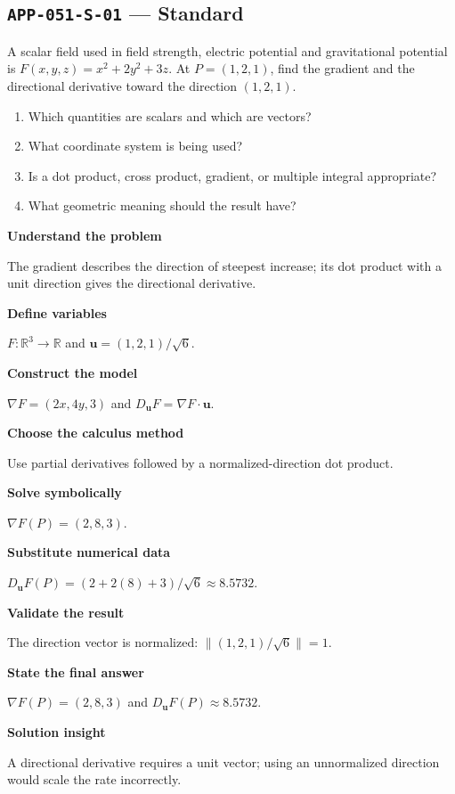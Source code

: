 \documentclass[11pt]{book}
\newcommand{\pid}[1]{\texttt{#1}}
\begin{document}
\subsection*{\pid{APP-051-S-01} — Standard}
\begin{problembox}
A scalar field used in field strength, electric potential and gravitational potential is $F(x,y,z)=x^2+2y^2+3z$. At $P=(1,2,1)$, find the gradient and the directional derivative toward the direction $(1,2,1)$.
\end{problembox}
\begin{promptbox}\begin{enumerate}
\item Which quantities are scalars and which are vectors?
\item What coordinate system is being used?
\item Is a dot product, cross product, gradient, or multiple integral appropriate?
\item What geometric meaning should the result have?
\end{enumerate}\end{promptbox}
\begin{solutionbox}
\textbf{Understand the problem}\par The gradient describes the direction of steepest increase; its dot product with a unit direction gives the directional derivative.\par\medskip
\textbf{Define variables}\par $F:\mathbb R^3\to\mathbb R$ and $\mathbf u=(1,2,1)/\sqrt6$.\par\medskip
\textbf{Construct the model}\par $\nabla F=(2x,4y,3)$ and $D_{\mathbf u}F=\nabla F\cdot\mathbf u$.\par\medskip
\textbf{Choose the calculus method}\par Use partial derivatives followed by a normalized-direction dot product.\par\medskip
\textbf{Solve symbolically}\par $\nabla F(P)=(2,8,3)$.\par\medskip
\textbf{Substitute numerical data}\par $D_{\mathbf u}F(P)=(2+2(8)+3)/\sqrt6\approx 8.5732$.\par\medskip
\textbf{Validate the result}\par The direction vector is normalized: $\|(1,2,1)/\sqrt6\|=1$.\par\medskip
\textbf{State the final answer}\par $\nabla F(P)=(2,8,3)$ and $D_{\mathbf u}F(P)\approx 8.5732$.\par\medskip
\textbf{Solution insight}\par A directional derivative requires a unit vector; using an unnormalized direction would scale the rate incorrectly.\par\medskip
\end{solutionbox}
\end{document}
